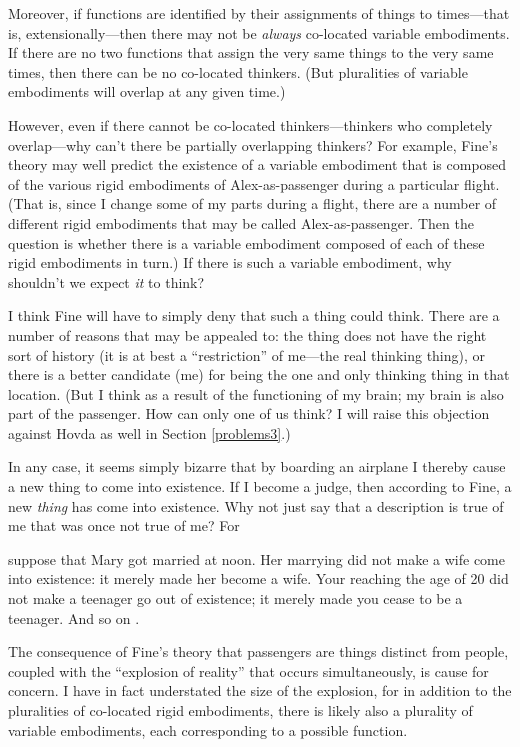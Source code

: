 \documentclass[12pt,twoside]{reedfancy}
\newenvironment{squote}{%
	\begin{spacing}{1}
	\begin{list}{}{%
	\setlength{\labelwidth}{0pt}%
	\rightmargin\leftmargin%
	}
	\item\relax
	}{%
	\end{list}%
	\end{spacing}
	}
\begin{document}
\begin{spacing}{1.25}
Moreover, if functions are identified by their assignments of things
to times---that is, extensionally---then there may not be {\em always}
co-located variable embodiments.  If there are no two functions that
assign the very same things to the very same times, then there can be
no co-located thinkers.  (But pluralities of variable embodiments will
overlap at any given time.)

However, even if there cannot be co-located thinkers---thinkers who
completely overlap---why can't there be partially overlapping
thinkers?  For example, Fine's theory may well predict the existence
of a variable embodiment that is composed of the various rigid
embodiments of Alex-as-passenger during a particular flight.  (That
is, since I change some of my parts during a flight, there are a
number of different rigid embodiments that may be called
Alex-as-passenger.  Then the question is whether there is a variable
embodiment composed of each of these rigid embodiments in turn.)  If
there is such a variable embodiment, why shouldn't we expect {\em it}
to think?

I think Fine will have to simply deny that such a thing could think.
There are a number of reasons that may be appealed to: the thing does
not have the right sort of history (it is at best a ``restriction'' of
me---the real thinking thing), or there is a better candidate (me) for
being the one and only thinking thing in that location.  (But I think
as a result of the functioning of my brain; my brain is also part of
the passenger.  How can only one of us think?  I will raise this
objection against Hovda as well in Section \ref{problems3}.)

In any case, it seems simply bizarre that by boarding an airplane I
thereby cause a new thing to come into existence.  If I become a
judge, then according to Fine, a new {\em thing} has come into
existence.  Why not just say that a description is true of me that was
once not true of me?  For

\begin{squote}
suppose that Mary got married at noon.  Her marrying did not make a
wife come into existence: it merely made her become a wife.  Your
reaching the age of 20 did not make a teenager go out of existence; it
merely made you cease to be a teenager.  And so on
\citep[151]{thomson1998a}.
\end{squote}

The consequence of Fine's theory that passengers are things distinct
from people, coupled with the ``explosion of reality'' that occurs
simultaneously, is cause for concern.  I have in fact understated the
size of the explosion, for in addition to the pluralities of
co-located rigid embodiments, there is likely also a plurality of
variable embodiments, each corresponding to a possible function.


\end{spacing}
\end{document}
